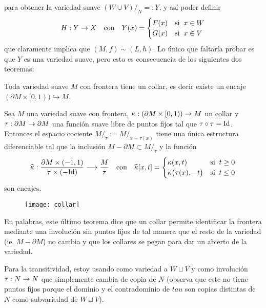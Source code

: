 \documentclass[../../topologia_algebraica]{subfiles}
\begin{document}
\noindent para obtener la variedad suave $(W\cup V)/_N=:Y$, y as\'i poder definir
\[
  H:Y\rightarrow X \quad\text{con}\quad  Y(x)=
  \begin{cases}
    F(x) & \text{si}\;\; x\in W \\
    G(x) & \text{si}\;\; x\in V
  \end{cases}
\]
que claramente implica que $(M,f)\sim (L,h)$. Lo \'unico que faltar\'ia probar es que $Y$
es una variedad suave, pero esto es consecuencia de los siguientes dos teoremas:

\begin{thm}
  Toda variedad suave $M$ con frontera tiene un collar, es decir existe un encaje
  $(\partial M\times [0,1))\hookrightarrow M$.
\end{thm}

\begin{thm}
  Sea $M$ una variedad suave con frontera, $\kappa:(\partial M\times[0,1))\rightarrow M$ un collar
  y $\tau:\partial M\rightarrow \partial M$ una funci\'on suave libre de puntos fijos tal que $\tau\circ\tau=\text{Id}$.
  Entonces el espacio cociente $M/_{\tau}:=M/_{x\sim\tau(x)}$ tiene una \'unica estructura
  diferenciable tal que la inclusi\'on $M-\partial M \subset M/_{\tau}$ y la funci\'on
  \[
    \widehat{ \kappa }:\frac{\partial M\times (-1,1)}{\tau\times(-\text{Id})} \longrightarrow \frac{M}{\tau}
    \quad\text{con}\quad \widehat{ \kappa }[x,t]=
    \begin{cases}
      \kappa(x,t) &\text{si}\;\; t\geq 0 \\
      \kappa\big(\tau(x),-t \big) & \text{si}\;\; t\leq 0
    \end{cases}
  \]
  son encajes.
  \begin{figure}[ht] %
    \centering
    \texttt{[image: collar]}
  \end{figure} %
\end{thm}

En palabras, este \'ultimo teorema dice que un collar permite identificar la frontera mediante
una involuci\'on sin puntos fijos de tal manera que el resto de la variedad (ie. $M-\partial M$)
no cambia y que los collares se pegan para dar un abierto de la variedad.

\begin{nota}
  Para la transitividad, estoy usando como variedad a $W\sqcup V$ y como involuci\'on $\tau:N\rightarrow N$
  que simplemente cambia de copia de $N$ (observa que este no tiene puntos fijos porque el dominio
  y el contradominio de $tau$ son copias distintas de $N$ como subvariedad de $W\sqcup V$).
\end{nota}
\end{document}
